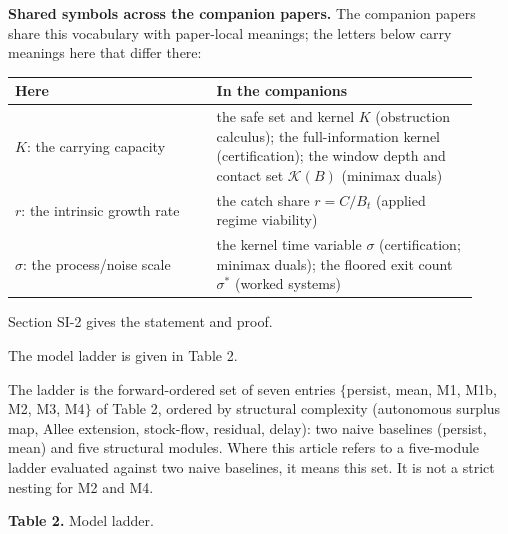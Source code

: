 \documentclass[11pt]{article}
\begin{document}
\medskip
\noindent\textbf{Shared symbols across the companion papers.} The
companion papers share this vocabulary with paper-local meanings; the
letters below carry meanings here that differ there:
\begin{center}\small
\begin{tabular}{@{}p{0.40\linewidth}p{0.52\linewidth}@{}}
\toprule
\textbf{Here} & \textbf{In the companions} \\
\midrule
\(K\): the carrying capacity &
the safe set and kernel \(K\) (obstruction calculus); the
full-information kernel (certification); the window depth and contact
set \(\mathcal{K}(B)\) (minimax duals) \\
\(r\): the intrinsic growth rate &
the catch share \(r = C/B_t\) (applied regime viability) \\
\(\sigma\): the process/noise scale &
the kernel time variable \(\sigma\) (certification; minimax duals);
the floored exit count \(\sigma^{*}\) (worked systems) \\
\bottomrule
\end{tabular}
\end{center}

Section SI-2 gives the statement and proof.

The model ladder is given in Table 2.

The ladder is the forward-ordered set of seven entries \(\{\)persist,
mean, M1, M1b, M2, M3, M4\(\}\) of Table 2, ordered by structural
complexity (autonomous surplus map, Allee extension, stock-flow,
residual, delay): two naive baselines (persist, mean) and five
structural modules. Where this article refers to a five-module ladder
evaluated against two naive baselines, it means this set. It is not a
strict nesting for M2 and M4.

\textbf{Table 2.} Model ladder.
\end{document}

